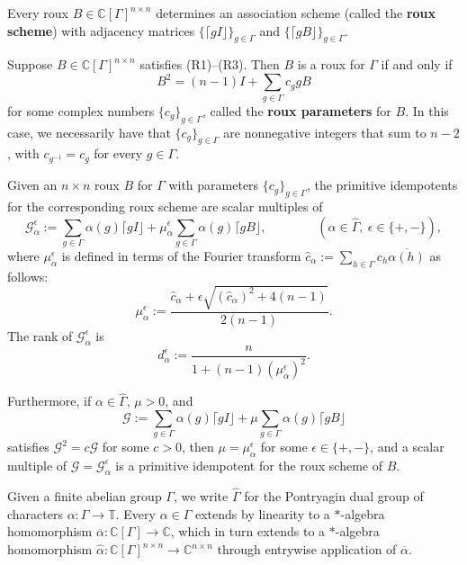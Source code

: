 Every roux $B \in \mathbb{C}[\Gamma]^{n\times n}$ determines an association scheme (called the \textbf{roux scheme}) with adjacency matrices $\{ \lceil g I \rfloor \}_{g \in \Gamma}$ and $\{ \lceil gB \rfloor \}_{g \in \Gamma}$.

\begin{proposition}
\label{prop.B squared}
Suppose $B\in\mathbb{C}[\Gamma]^{n\times n}$ satisfies (R1)--(R3).
Then $B$ is a roux for $\Gamma$ if and only if
\[
B^2=(n-1)I+\sum_{g\in\Gamma}c_ggB
\]
for some complex numbers $\{c_g\}_{g\in\Gamma}$, called the \textbf{roux parameters} for $B$.
In this case, we necessarily have that $\{c_g\}_{g\in\Gamma}$ are nonnegative integers that sum to $n-2$, with $c_{g^{-1}}=c_g$ for every $g\in\Gamma$.
\end{proposition}


\begin{proposition}
\label{prop.roux primitive idempotents}
Given an $n\times n$ roux $B$ for $\Gamma$ with parameters $\{ c_g \}_{g \in \Gamma}$, the primitive idempotents for the corresponding roux scheme are scalar multiples of
\[
\mathcal{G}_{\alpha}^\epsilon
:=\sum_{g\in\Gamma}\alpha(g)\lceil gI\rfloor+\mu_\alpha^\epsilon\sum_{g\in\Gamma}\alpha(g) \lceil gB \rfloor,
\qquad
\qquad
(\alpha\in\hat\Gamma,~\epsilon\in\{+,-\}),
\]
where $\mu_\alpha^\epsilon$ is defined in terms of the Fourier transform $\hat{c}_\alpha:=\sum_{h\in\Gamma}c_h\overline{\alpha(h)}$ as follows:
\[
\mu_\alpha^\epsilon
:=\frac{\hat{c}_\alpha+\epsilon\sqrt{(\hat{c}_\alpha)^2+4(n-1)}}{2(n-1)}.
\]
The rank of $\mathcal{G}_\alpha^\epsilon$ is
\[
d_\alpha^\epsilon :=\frac{n}{1+(n-1)(\mu_\alpha^\epsilon)^2}.
\]

Furthermore, if $\alpha \in \hat{\Gamma}$, $\mu > 0$, and 
\[ \mathcal{G} := \sum_{g\in\Gamma}\alpha(g)\lceil gI\rfloor+\mu \sum_{g\in\Gamma}\alpha(g) \lceil gB \rfloor \]
satisfies $\mathcal{G}^2 = c \mathcal{G}$ for some $c >0$, then $\mu = \mu_\alpha^\epsilon$ for some $\epsilon \in \{ +, - \}$, and a scalar multiple of $\mathcal{G} = \mathcal{G}_\alpha^\epsilon$ is a primitive idempotent for the roux scheme of $B$.
\end{proposition}

Given a finite abelian group $\Gamma$, we write $\hat{\Gamma}$ for the Pontryagin dual group of characters $\alpha \colon \Gamma \to \mathbb{T}$.
Every $\alpha \in \hat{\Gamma}$ extends by linearity to a $\ast$-algebra homomorphism $\overline{\alpha} \colon \mathbb{C}[\Gamma] \to \mathbb{C}$, which in turn extends to a $\ast$-algebra homomorphism $\hat{\alpha} \colon \mathbb{C}[\Gamma]^{n\times n} \to \mathbb{C}^{n\times n}$ through entrywise application of $\overline{\alpha}$.

